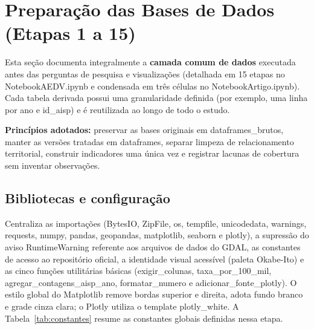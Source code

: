 \documentclass[11pt,a4paper]{article}
\newcommand{\code}[1]{{\ttfamily\footnotesize\allowbreak #1}}
\begin{document}
\section{Preparação das Bases de Dados (Etapas 1 a 15)}

Esta seção documenta integralmente a \textbf{camada comum de dados} executada antes das perguntas de pesquisa e visualizações (detalhada em 15 etapas no \code{NotebookAEDV.ipynb} e condensada em três células no \code{NotebookArtigo.ipynb}). Cada tabela derivada possui uma granularidade definida (por exemplo, uma linha por \code{ano} e \code{id\_aisp}) e é reutilizada ao longo de todo o estudo.

\textbf{Princípios adotados:} preservar as bases originais em \code{dataframes\_brutos}, manter as versões tratadas em \code{dataframes}, separar limpeza de relacionamento territorial, construir indicadores uma única vez e registrar lacunas de cobertura sem inventar observações.

\subsection{Bibliotecas e configuração}
Centraliza as importações (\code{BytesIO}, \code{ZipFile}, \code{os}, \code{tempfile}, \code{unicodedata}, \code{warnings}, \code{requests}, \code{numpy}, \code{pandas}, \code{geopandas}, \code{matplotlib}, \code{seaborn} e \code{plotly}), a supressão do aviso \code{RuntimeWarning} referente aos arquivos de dados do GDAL, as constantes de acesso ao repositório oficial, a identidade visual acessível (paleta Okabe-Ito) e as cinco funções utilitárias básicas (\code{exigir\_colunas}, \code{taxa\_por\_100\_mil}, \code{agregar\_contagens\_aisp\_ano}, \code{formatar\_numero} e \code{adicionar\_fonte\_plotly}). O estilo global do Matplotlib remove bordas superior e direita, adota fundo branco e grade cinza clara; o Plotly utiliza o template \code{plotly\_white}. A Tabela~\ref{tab:constantes} resume as constantes globais definidas nessa etapa.
\end{document}
